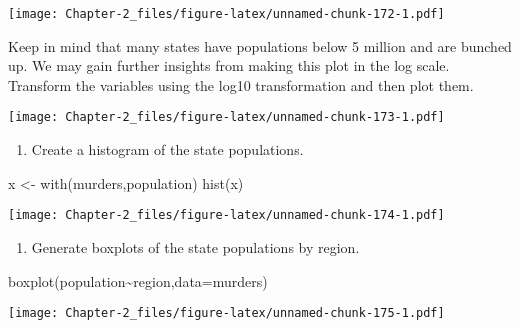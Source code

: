 \documentclass[
]{article}
\newenvironment{Shaded}{\begin{snugshade}}{\end{snugshade}}
\newcommand{\AttributeTok}[1]{\textcolor[rgb]{0.77,0.63,0.00}{#1}}
\newcommand{\DecValTok}[1]{\textcolor[rgb]{0.00,0.00,0.81}{#1}}
\newcommand{\FunctionTok}[1]{\textcolor[rgb]{0.00,0.00,0.00}{#1}}
\newcommand{\NormalTok}[1]{#1}
\newcommand{\OtherTok}[1]{\textcolor[rgb]{0.56,0.35,0.01}{#1}}
\newcommand{\SpecialCharTok}[1]{\textcolor[rgb]{0.00,0.00,0.00}{#1}}
\providecommand{\tightlist}{%
  \setlength{\itemsep}{0pt}\setlength{\parskip}{0pt}}
\begin{document}
\texttt{[image: Chapter-2\_files/figure-latex/unnamed-chunk-172-1.pdf]}

Keep in mind that many states have populations below 5 million and are
bunched up. We may gain further insights from making this plot in the
log scale. Transform the variables using the log10 transformation and
then plot them.

\begin{Shaded}
\end{Shaded}

\texttt{[image: Chapter-2\_files/figure-latex/unnamed-chunk-173-1.pdf]}

\begin{enumerate}
\def\labelenumi{\arabic{enumi}.}
\setcounter{enumi}{1}
\tightlist
\item
  Create a histogram of the state populations.
\end{enumerate}

\begin{Shaded}
\begin{Highlighting}[]
\NormalTok{x }\OtherTok{\textless{}{-}} \FunctionTok{with}\NormalTok{(murders,population)}
\FunctionTok{hist}\NormalTok{(x)}
\end{Highlighting}
\end{Shaded}

\texttt{[image: Chapter-2\_files/figure-latex/unnamed-chunk-174-1.pdf]}

\begin{enumerate}
\def\labelenumi{\arabic{enumi}.}
\setcounter{enumi}{2}
\tightlist
\item
  Generate boxplots of the state populations by region.
\end{enumerate}

\begin{Shaded}
\begin{Highlighting}[]
\FunctionTok{boxplot}\NormalTok{(population}\SpecialCharTok{\textasciitilde{}}\NormalTok{region,}\AttributeTok{data=}\NormalTok{murders)}
\end{Highlighting}
\end{Shaded}

\texttt{[image: Chapter-2\_files/figure-latex/unnamed-chunk-175-1.pdf]}
\end{document}

